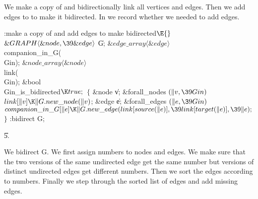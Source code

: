 We make  a copy of  and bidirectionally link all
vertices and
edges. Then we add edges to  to make it bidirected. In
 we record whether we needed to add edges.

\Y\B\4:make  a copy of  and add edges to make 
bidirected\X${}\E{}$\6
$\&{GRAPH}\langle\&{node},\39\&{edge}\rangle{}$ \|G;\6
${}\&{edge\_array}\langle\&{edge}\rangle{}$ \\{companion\_in\_G}(\\{Gin});\6
${}\&{node\_array}\langle\&{node}\rangle{}$ \\{link}(\\{Gin});\6
\&{bool} \\{Gin\_is\_bidirected}${}\K\\{true};{}$\7
${}\{{}$\1\6
\&{node} \|v;\7
\&{forall\_nodes} ${}(\|v,\39\\{Gin}){}$\1\5
${}\\{link}[\|v]\K\|G.\\{new\_node}(\|v){}$;\2\7
\&{edge} \|e;\7
\&{forall\_edges} ${}(\|e,\39\\{Gin}){}$\1\5
${}\\{companion\_in\_G}[\|e]\K\|G.\\{new\_edge}(\\{link}[\\{source}(\|e)],\39%
\\{link}[\\{target}(\|e)],\39\|e);{}$\2\6
\4${}\}{}$\2\6
:bidirect G\X;\par
\U5.\fi

We bidirect G. We first assign numbers to nodes and edges. We make sure
that
the two versions of the same undirected edge get the same number but versions
of distinct undirected edges get different numbers. Then we sort the edges
according to numbers. Finally we step through the sorted list of edges
and add
missing edges.


